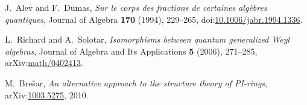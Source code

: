 J.~Alev and F.~Dumas,
\emph{Sur le corps des fractions de certaines alg\`ebres quantiques},
Journal of Algebra \textbf{170} (1994), 229--265,
doi:\href{https://doi.org/10.1006/jabr.1994.1336}{10.1006/jabr.1994.1336}.

L.~Richard and A.~Solotar,
\emph{Isomorphisms between quantum generalized Weyl algebras},
Journal of Algebra and Its Applications \textbf{5} (2006), 271--285,
arXiv:\href{https://arxiv.org/abs/math/0402413}{math/0402413}.

M.~Bre\v{s}ar,
\emph{An alternative approach to the structure theory of PI-rings},
arXiv:\href{https://arxiv.org/abs/1003.5275}{1003.5275}, 2010.
